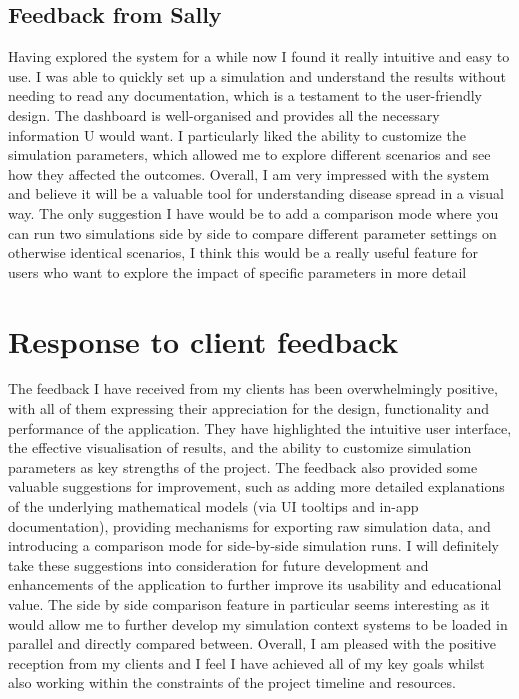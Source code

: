 \subsection*{Feedback from Sally}
Having explored the system for a while now I found it really intuitive and easy to use. I was able to quickly set up a simulation and understand the results without needing to read any documentation, which is a testament to the user-friendly design. The dashboard is well-organised and provides all the necessary information U would want. I particularly liked the ability to customize the simulation parameters, which allowed me to explore different scenarios and see how they affected the outcomes. Overall, I am very impressed with the system and believe it will be a valuable tool for understanding disease spread in a visual way. The only suggestion I have would be to add a comparison mode where you can run two simulations side by side to compare different parameter settings on otherwise identical scenarios, I think this would be a really useful feature for users who want to explore the impact of specific parameters in more detail

\section{Response to client feedback}
The feedback I have received from my clients has been overwhelmingly positive, with all of them expressing their appreciation for the design, functionality and performance of the application. They have highlighted the intuitive user interface, the effective visualisation of results, and the ability to customize simulation parameters as key strengths of the project. The feedback also provided some valuable suggestions for improvement, such as adding more detailed explanations of the underlying mathematical models (via UI tooltips and in-app documentation), providing mechanisms for exporting raw simulation data, and introducing a comparison mode for side-by-side simulation runs. I will definitely take these suggestions into consideration for future development and enhancements of the application to further improve its usability and educational value. The side by side comparison feature in particular seems interesting as it would allow me to further develop my simulation context systems to be loaded in parallel and directly compared between. Overall, I am pleased with the positive reception from my clients and I feel I have achieved all of my key goals whilst also working within the constraints of the project timeline and resources. 

